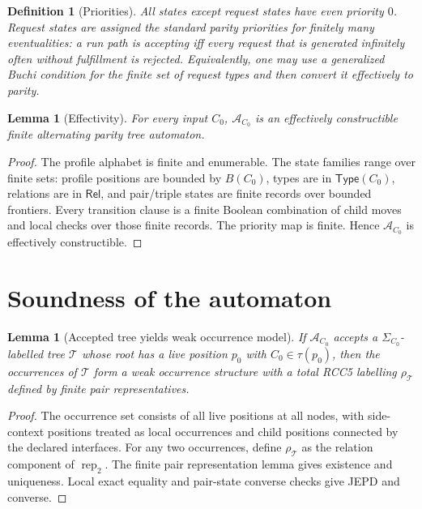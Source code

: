 \documentclass[11pt]{article}
\newtheorem{lemma}[theorem]{Lemma}
\newtheorem{definition}[theorem]{Definition}
\newcommand{\Rel}{\mathsf{Rel}}
\newcommand{\Typ}{\mathsf{Type}}
\newcommand{\Aut}{\mathcal A}
\begin{document}
\begin{definition}[Priorities]
All states except request states have even priority $0$.  Request states are assigned the standard parity priorities for finitely many eventualities: a run path is accepting iff every request that is generated infinitely often without fulfillment is rejected.  Equivalently, one may use a generalized Buchi condition for the finite set of request types and then convert it effectively to parity.
\end{definition}

\begin{lemma}[Effectivity]
For every input $C_0$, $\Aut_{C_0}$ is an effectively constructible finite alternating parity tree automaton.
\end{lemma}

\begin{proof}
The profile alphabet is finite and enumerable.  The state families range over finite sets: profile positions are bounded by $B(C_0)$, types are in $\Typ(C_0)$, relations are in $\Rel$, and pair/triple states are finite records over bounded frontiers.  Every transition clause is a finite Boolean combination of child moves and local checks over those finite records.  The priority map is finite.  Hence $\Aut_{C_0}$ is effectively constructible.
\end{proof}

\section{Soundness of the automaton}

\begin{lemma}[Accepted tree yields weak occurrence model]
If $\Aut_{C_0}$ accepts a $\Sigma_{C_0}$-labelled tree $\mathcal T$ whose root has a live position $p_0$ with $C_0\in\tau(p_0)$, then the occurrences of $\mathcal T$ form a weak occurrence structure with a total RCC5 labelling $\rho_\mathcal T$ defined by finite pair representatives.
\end{lemma}

\begin{proof}
The occurrence set consists of all live positions at all nodes, with side-context positions treated as local occurrences and child positions connected by the declared interfaces.  For any two occurrences, define $\rho_\mathcal T$ as the relation component of $\operatorname{rep}_2$.  The finite pair representation lemma gives existence and uniqueness.  Local exact equality and pair-state converse checks give JEPD and converse.
\end{proof}
\end{document}
